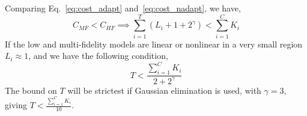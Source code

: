 Comparing Eq.~\eqref{eq:cost_adapt} and~\eqref{eq:cost_nadapt}, we have,
%
\begin{equation}
\label{eq:cost_compare_0}
C_{MF} < C_{HF} \implies \sum_{i=1}^{T} (L_i + 1 + 2^{\gamma}) < \sum\limits_{i=1}^{C}K_{i}
\end{equation}
%
If the low and multi-fidelity models are linear or nonlinear in a very small region $L_i \approx 1$, and we have the following condition,
%
\begin{equation}
\label{eq:cost_compare_1}
T < \frac{\sum\limits_{i=1}^{C}K_{i}}{2 + 2^{\gamma}}
\end{equation}
% 
The bound on $T$ will be strictest if Gaussian elimination is used, with $\gamma = 3$, giving $T < \frac{\sum\limits_{i=1}^{C}K_{i}}{10}$.
%



